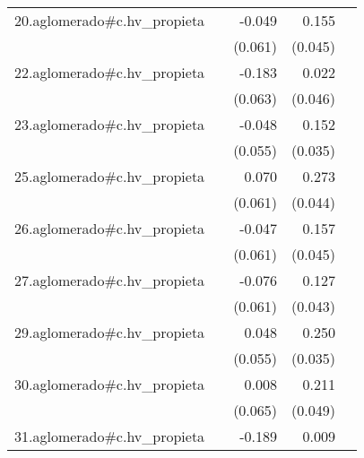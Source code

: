 {\begin{longtable}{l*{4}{D{.}{.}{-1}}}
\addlinespace
20.aglomerado#c.hv\_propieta&                     &      -0.049         &       0.155\sym{***}&                     \\
            &                     &     (0.061)         &     (0.045)         &                     \\
\addlinespace
22.aglomerado#c.hv\_propieta&                     &      -0.183\sym{**} &       0.022         &                     \\
            &                     &     (0.063)         &     (0.046)         &                     \\
\addlinespace
23.aglomerado#c.hv\_propieta&                     &      -0.048         &       0.152\sym{***}&                     \\
            &                     &     (0.055)         &     (0.035)         &                     \\
\addlinespace
25.aglomerado#c.hv\_propieta&                     &       0.070         &       0.273\sym{***}&                     \\
            &                     &     (0.061)         &     (0.044)         &                     \\
\addlinespace
26.aglomerado#c.hv\_propieta&                     &      -0.047         &       0.157\sym{***}&                     \\
            &                     &     (0.061)         &     (0.045)         &                     \\
\addlinespace
27.aglomerado#c.hv\_propieta&                     &      -0.076         &       0.127\sym{**} &                     \\
            &                     &     (0.061)         &     (0.043)         &                     \\
\addlinespace
29.aglomerado#c.hv\_propieta&                     &       0.048         &       0.250\sym{***}&                     \\
            &                     &     (0.055)         &     (0.035)         &                     \\
\addlinespace
30.aglomerado#c.hv\_propieta&                     &       0.008         &       0.211\sym{***}&                     \\
            &                     &     (0.065)         &     (0.049)         &                     \\
\addlinespace
31.aglomerado#c.hv\_propieta&                     &      -0.189\sym{**} &       0.009         &                     \\

\end{longtable}}

